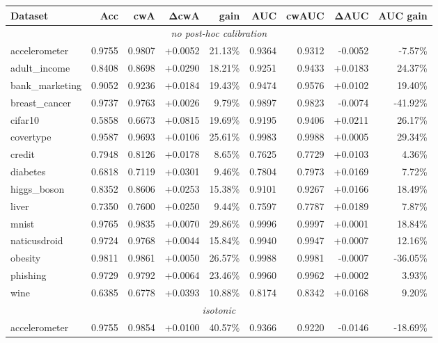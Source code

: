 \documentclass{article}
\theoremstyle{plain}
\theoremstyle{definition}
\theoremstyle{remark}
\begin{document}
\begin{table}[ht]
\centering
\footnotesize
\begin{tabular}{lrrrrrrrr}
\toprule
\textbf{Dataset} & \textbf{Acc} & \textbf{cwA} & $\boldsymbol{\Delta}$\textbf{cwA} & \textbf{gain} & \textbf{AUC} & \textbf{cwAUC} & $\boldsymbol{\Delta}$\textbf{AUC } & \textbf{AUC gain} \\
\midrule
\multicolumn{9}{c}{\textit{no post-hoc calibration}} \\
\midrule
accelerometer & 0.9755 & 0.9807 & +0.0052 & 21.13\% & 0.9364 & 0.9312 & -0.0052 & -7.57\% \\
adult\_income & 0.8408 & 0.8698 & +0.0290 & 18.21\% & 0.9251 & 0.9433 & +0.0183 & 24.37\% \\
bank\_marketing & 0.9052 & 0.9236 & +0.0184 & 19.43\% & 0.9474 & 0.9576 & +0.0102 & 19.40\% \\
breast\_cancer & 0.9737 & 0.9763 & +0.0026 & 9.79\% & 0.9897 & 0.9823 & -0.0074 & -41.92\% \\
cifar10 & 0.5858 & 0.6673 & +0.0815 & 19.69\% & 0.9195 & 0.9406 & +0.0211 & 26.17\% \\
covertype & 0.9587 & 0.9693 & +0.0106 & 25.61\% & 0.9983 & 0.9988 & +0.0005 & 29.34\% \\
credit & 0.7948 & 0.8126 & +0.0178 & 8.65\% & 0.7625 & 0.7729 & +0.0103 & 4.36\% \\
diabetes & 0.6818 & 0.7119 & +0.0301 & 9.46\% & 0.7804 & 0.7973 & +0.0169 & 7.72\% \\
higgs\_boson & 0.8352 & 0.8606 & +0.0253 & 15.38\% & 0.9101 & 0.9267 & +0.0166 & 18.49\% \\
liver & 0.7350 & 0.7600 & +0.0250 & 9.44\% & 0.7597 & 0.7787 & +0.0189 & 7.87\% \\
mnist & 0.9765 & 0.9835 & +0.0070 & 29.86\% & 0.9996 & 0.9997 & +0.0001 & 18.84\% \\
naticusdroid & 0.9724 & 0.9768 & +0.0044 & 15.84\% & 0.9940 & 0.9947 & +0.0007 & 12.16\% \\
obesity & 0.9811 & 0.9861 & +0.0050 & 26.57\% & 0.9988 & 0.9981 & -0.0007 & -36.05\% \\
phishing & 0.9729 & 0.9792 & +0.0064 & 23.46\% & 0.9960 & 0.9962 & +0.0002 & 3.93\% \\
wine & 0.6385 & 0.6778 & +0.0393 & 10.88\% & 0.8174 & 0.8342 & +0.0168 & 9.20\% \\
\midrule
\multicolumn{9}{c}{\textit{isotonic}} \\
\midrule
accelerometer & 0.9755 & 0.9854 & +0.0100 & 40.57\% & 0.9366 & 0.9220 & -0.0146 & -18.69\% \\

\end{tabular}
\end{table}
\end{document}
